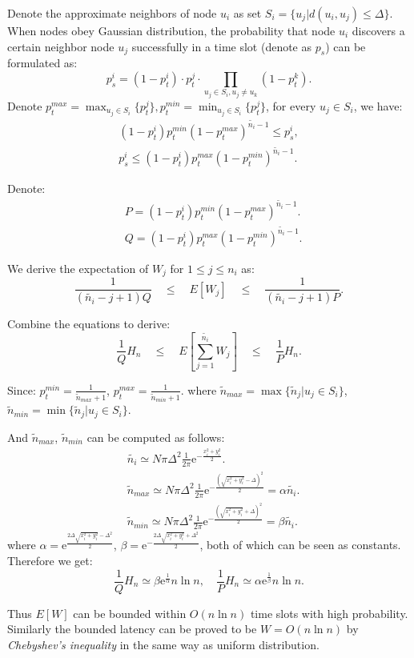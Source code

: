 \begin{IEEEproof}
Denote the approximate neighbors of node $u_i$ as set $S_i = \{u_j | d(u_i, u_j) \leq \Delta \}$. When nodes obey Gaussian distribution, the probability that node $u_i$ discovers a certain neighbor node $u_{j}$ successfully in a time slot (denote as $p_{s}$) can be formulated as:
$$
p_{s}^i = (1-p_t^i) \cdot p_t^{j} \cdot \prod_{u_j \in S_i, u_j \neq u_k}(1-p_t^{k}).
$$
Denote $p_t^{max} = \max_{u_j \in S_i}\{p_t^{j}\}, p_t^{min} = \min_{u_j \in S_i}\{p_t^{j}\}$,
for every $u_j \in S_i$, we have:
\begin{equation*}
\begin{split}
(1-p_t^i)p_t^{min}{(1-p_t^{max})}^{\widetilde{n_i}-1} \leq p_{s}^i,  \\ %
p_{s}^i \leq (1-p_t^i)p_t^{max}{(1-p_t^{min})}^{\widetilde{n_i}-1}.
\end{split}
\end{equation*}

Denote: 
\begin{align*}
&P = (1-p_t^i)p_t^{min}{(1-p_t^{max})}^{\widetilde{n_i}-1}. \\
&Q = (1-p_t^i)p_t^{max}{(1-p_t^{min})}^{\widetilde{n_i}-1}.
\end{align*}

We derive the expectation of $W_j$ for $1 \leq j \leq n_i$ as:
$$
\frac{1}{(\widetilde{n_i}-j+1)Q} \quad \leq \quad E[W_j] \quad \leq \quad \frac{1}{(\widetilde{n_i}-j+1)P}.
$$

Combine the equations to derive:
$$
\frac{1}{Q}H_n  \quad \leq \quad E[\sum_{j=1}^{\widetilde{n_i}}W_j]  \quad \leq \quad \frac{1}{P}H_n.
$$

Since: $p_t^{min} = \frac{1}{\widetilde{n}_{max}+1}$, $p_t^{max} = \frac{1}{\widetilde{n}_{min}+1}.$
where $\widetilde{n}_{max} = \max\{\widetilde{n}_j | u_j\in S_i \}$, $\widetilde{n}_{min} = \min\{\widetilde{n}_j | u_j\in S_i \}$. 

And $\widetilde{n}_{max}$, $\widetilde{n}_{min}$ can be computed as follows:
\begin{align*}
&\widetilde{n_i} \simeq N\pi \Delta^2 \frac{1}{2\pi}\mathrm{e}^{-\frac{x_i^2+y_i^2}{2}}.							\\
&\widetilde{n}_{max}  \simeq N\pi \Delta^2 \frac{1}{2\pi}\mathrm{e}^{-\frac{{(\sqrt{x_i^2+y_i^2}-\Delta)}^2}{2}}  = \alpha\widetilde{n_i}.\\
&\widetilde{n}_{min}  \simeq N\pi \Delta^2 \frac{1}{2\pi}\mathrm{e}^{-\frac{{(\sqrt{x_i^2+y_i^2}+\Delta)}^2}{2}}  = \beta\widetilde{n_i}.
\end{align*}
where $\alpha = \mathrm{e}^{\frac{2\Delta\sqrt{x_i^2+y_i^2} - \Delta^2}{2}}$, 
$\beta = \mathrm{e}^{-\frac{2\Delta\sqrt{x_i^2+y_i^2} + \Delta^2}{2}}$, both of which can be seen as constants. Therefore we get:
$$
\frac{1}{Q}H_n \simeq \beta\mathrm{e}^{\frac{1}{\alpha}}n\ln n, \quad \frac{1}{P}H_n \simeq \alpha\mathrm{e}^{\frac{1}{\beta}}n\ln n. 
$$

Thus $E[W]$ can be bounded within $O(n\ln n)$ time slots with high probability.
Similarly the bounded latency can be proved to be $W=O(n\ln n)$ by \emph{Chebyshev's inequality} in the same way as
uniform distribution.
\end{IEEEproof}


